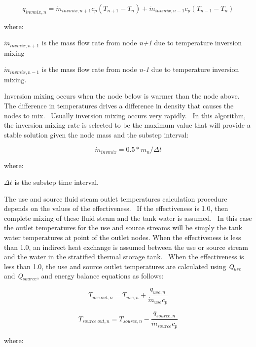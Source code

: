 \begin{equation}
{q_{invmix,n}} = {\dot m_{invmix,n + 1}}{c_p}({T_{n + 1}} - {T_n}) + {\dot m_{invmix,n - 1}}{c_p}({T_{n - 1}} - {T_n})
\end{equation}

where:

\({\dot m_{invmix,n + 1}}\) is the mass flow rate from node \emph{n+1} due to temperature inversion mixing

\({\dot m_{invmix,n - 1}}\) is the mass flow rate from node \emph{n-1} due to temperature inversion mixing.

Inversion mixing occurs when the node below is warmer than the node above.~ The difference in temperatures drives a difference in density that causes the nodes to mix.~ Usually inversion mixing occurs very rapidly.~ In this algorithm, the inversion mixing rate is selected to be the maximum value that will provide a stable solution given the node mass and the substep interval:

\begin{equation}
{\dot m_{invmix}} = 0.5*{m_n}/\Delta t
\end{equation}

where:

\(\Delta t\) is the substep time interval.

The use and source fluid steam outlet temperatures calculation procedure depends on the values of the effectiveness.~ If the effectiveness is 1.0, then complete mixing of these fluid steam and the tank water is assumed.~ In this case the outlet temperatures for the use and source streams will be simply the tank water temperatures at point of the outlet nodes. When the effectiveness is less than 1.0, an indirect heat exchange is assumed between the use or source stream and the water in the stratified thermal storage tank.~ When the effectiveness is less than 1.0, the use and source outlet temperatures are calculated using \emph{Q\(_{use}\)} and \emph{Q\(_{source}\)}, and energy balance equations as follows:

\begin{equation}
{T_{use~out,n}} = {T_{use,n}} + \frac{{{q_{use,n}}}}{{{{\dot m}_{use}}{c_p}}}
\end{equation}

\begin{equation}
{T_{source~out,n}} = {T_{source,n}} - \frac{{{q_{source,n}}}}{{{{\dot m}_{source}}{c_p}}}
\end{equation}

where:

